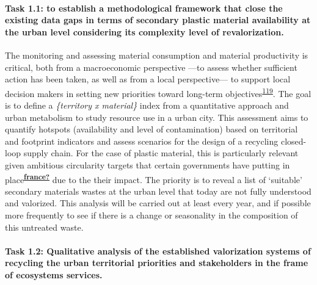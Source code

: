 \documentclass[
  12pt,
  a4paperpaper,
  onecolumn]{article}
\let\oldparagraph\paragraph
\renewcommand{\paragraph}[1]{\oldparagraph{#1}\mbox{}}
\let\paragraph\oldparagraph
\begin{document}
\hypertarget{task-1.1-to-establish-a-methodological-framework-that-close-the-existing-data-gaps-in-terms-of-secondary-plastic-material-availability-at-the-urban-level-considering-its-complexity-level-of-revalorization.}{%
\paragraph{Task 1.1: to establish a methodological framework that close
the existing data gaps in terms of secondary plastic material
availability at the urban level considering its complexity level of
revalorization.}\label{task-1.1-to-establish-a-methodological-framework-that-close-the-existing-data-gaps-in-terms-of-secondary-plastic-material-availability-at-the-urban-level-considering-its-complexity-level-of-revalorization.}}

The monitoring and assessing material consumption and material
productivity is critical, both from a macroeconomic perspective ---to
assess whether sufficient action has been taken, as well as from a local
perspective--- to support local decision makers in setting new
priorities toward long-term
objectives\textsuperscript{\protect\hyperlink{ref-Bianchi2020}{119}}.
The goal is to define a \emph{\{territory x material\}} index from a
quantitative approach and urban metabolism to study resource use in a
urban city. This assessment aims to quantify hotspots (availability and
level of contamination) based on territorial and footprint indicators
and assess scenarios for the design of a recycling closed-loop supply
chain. For the case of plastic material, this is particularly relevant
given ambitious circularity targets that certain governments have
putting in
place\textsuperscript{\protect\hyperlink{ref-france}{\textbf{france?}}}
due to the their impact. The priority is to reveal a list of `suitable'
secondary materials wastes at the urban level that today are not fully
understood and valorized. This analysis will be carried out at least
every year, and if possible more frequently to see if there is a change
or seasonality in the composition of this untreated waste.

\hypertarget{task-1.2-qualitative-analysis-of-the-established-valorization-systems-of-recycling-the-urban-territorial-priorities-and-stakeholders-in-the-frame-of-ecosystems-services.}{%
\paragraph{Task 1.2: Qualitative analysis of the established
valorization systems of recycling the urban territorial priorities and
stakeholders in the frame of ecosystems
services.}\label{task-1.2-qualitative-analysis-of-the-established-valorization-systems-of-recycling-the-urban-territorial-priorities-and-stakeholders-in-the-frame-of-ecosystems-services.}}
\end{document}

